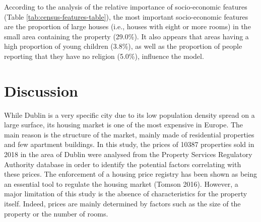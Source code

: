 \documentclass[conference,final,]{IEEEtran}
\begin{document}
According to the analysis of the relative importance of socio-economic features (Table \ref{tab:census-features-table}), the most important socio-economic features are the proportion of large houses (i.e., houses with eight or more rooms) in the small area containing the property (29.0\%). It also appears that areas having a high proportion of young children (3.8\%), as well as the proportion of people reporting that they have no religion (5.0\%), influence the model.

\hypertarget{discussion}{%
\section{Discussion}\label{discussion}}

While Dublin is a very specific city due to its low population density spread on a large surface, its housing market is one of the most expensive in Europe. The main reason is the structure of the market, mainly made of residential properties and few apartment buildings. In this study, the prices of 10387 properties sold in 2018 in the area of Dublin were analysed from the Property Services Regulatory Authority database in order to identify the potential factors correlating with these prices. The enforcement of a housing price registry has been shown as being an essential tool to regulate the housing market (Tomson 2016). However, a major limitation of this study is the absence of characteristics for the property itself. Indeed, prices are mainly determined by factors such as the size of the property or the number of rooms.
\end{document}
